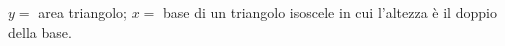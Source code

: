 {$y =$ area triangolo; $x =$ base di un triangolo isoscele 
in cui l'altezza è il doppio della base}.